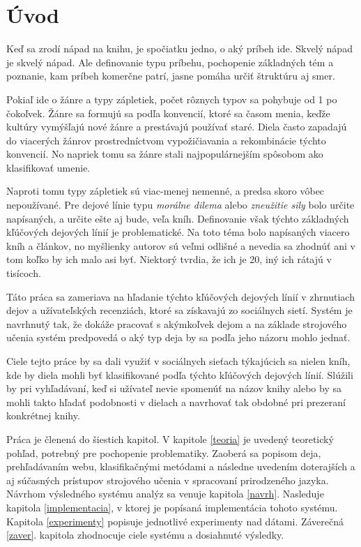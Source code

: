 
\chapter{Úvod}

Keď sa zrodí nápad na knihu, je spočiatku jedno, o aký príbeh ide. Skvelý nápad je skvelý nápad. Ale definovanie typu príbehu, pochopenie základných tém a poznanie, kam príbeh komerčne patrí, jasne pomáha určiť štruktúru aj smer.

Pokiaľ ide o žánre a typy zápletiek, počet rôznych typov sa pohybuje od 1 po čokoľvek. Žánre sa formujú sa podľa konvencií, ktoré sa časom menia, keďže kultúry vymýšľajú nové žánre a prestávajú používať staré. Diela často zapadajú do viacerých žánrov prostredníctvom vypožičiavania a rekombinácie týchto konvencií. No napriek tomu sa žánre stali najpopulárnejším spôsobom ako klasifikovať umenie.

Naproti tomu typy zápletiek sú viac-menej nemenné, a predsa skoro vôbec nepoužívané. Pre dejové línie typu \textit{morálne dilema} alebo \textit{zneužitie sily} bolo určite napísaných, a určite ešte aj bude, veľa kníh. Definovanie však týchto základných kľúčových dejových línií je problematické. Na toto téma bolo napísaných viacero kníh a článkov, no myšlienky autorov sú veľmi odlišné a nevedia sa zhodnúť ani v tom koľko by ich malo asi byť. Niektorý tvrdia, že ich je 20, iný ich rátajú v tisícoch. 

Táto práca sa zameriava na hľadanie týchto kľúčových dejových línií v zhrnutiach dejov a užívateľských recenziách, ktoré sa získavajú zo sociálnych sietí. Systém je navrhnutý tak, že dokáže pracovať s akýmkoľvek dejom a na základe strojového učenia systém predpovedá o aký typ deja by sa podľa jeho názoru mohlo jednať.

Ciele tejto práce by sa dali využiť v sociálnych sieťach týkajúcich sa nielen kníh, kde by diela mohli byť klasifikované podľa týchto kľúčových dejových línií. Slúžili by pri vyhľadávaní, keď si užívateľ nevie spomenúť na názov knihy alebo by sa mohli takto hľadať podobnosti v dielach a navrhovať tak obdobné pri prezeraní konkrétnej knihy.

Práca je členená do šiestich kapitol. V kapitole \ref{teoria} je uvedený teoretický pohľad, potrebný pre pochopenie problematiky. Zaoberá sa popisom deja, prehľadávaním webu, klasifikačnými metódami a následne uvedením doterajších a aj súčasných prístupov strojového učenia v spracovaní prirodzeného jazyka. Návrhom výsledného systému analýz sa venuje kapitola \ref{navrh}. Nasleduje kapitola \ref{implementacia}, v ktorej je popísaná implementácia tohoto systému. Kapitola \ref{experimenty} popisuje jednotlivé experimenty nad dátami. Záverečná \ref{zaver}. kapitola zhodnocuje ciele systému a dosiahnuté výsledky.

